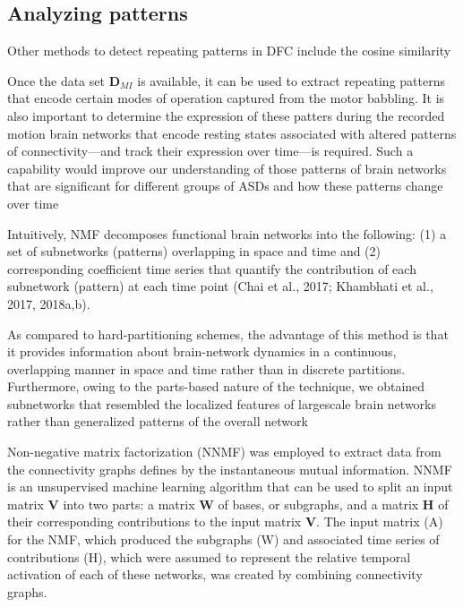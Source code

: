 \subsection{Analyzing patterns}


Other methods to detect repeating patterns in DFC include the cosine similarity \cite{Menon2019comparisonstaticdynamic}


Once the data set $\bm{D}_{MI}$ is available, it can be used to extract repeating patterns that encode certain modes of operation captured from the motor babbling. It is also important to determine the expression of these patters during the recorded motion
brain networks that encode resting states associated with altered patterns of connectivity—and track their expression over time—is required. Such a capability would improve our understanding of those
patterns of brain networks that are significant for different groups of
ASDs and how these patterns change over time

Intuitively, NMF decomposes functional brain networks into the following: (1) a set of subnetworks (patterns) overlapping in space and
time and (2) corresponding coefficient time series that quantify the
contribution of each subnetwork (pattern) at each time point
(Chai et al., 2017; Khambhati et al., 2017, 2018a,b). 

As compared to
hard-partitioning schemes, the advantage of this method is that it
provides information about brain-network dynamics in a continuous,
overlapping manner in space and time rather than in discrete partitions.
Furthermore, owing to the parts-based nature of the technique, we
obtained subnetworks that resembled the localized features of largescale brain networks rather than generalized patterns of the overall
network

Non-negative matrix factorization (NNMF) \cite{Fu2019Nonnegativematrixfactorization} was employed to extract data from the connectivity graphs defines by the instantaneous mutual information. NNMF is an unsupervised machine learning algorithm that can be used to split an input matrix $\bm{V}$ into two parts: a matrix $\bm{W}$ of bases, or subgraphs, and a matrix $\bm{H}$ of their corresponding contributions to the input matrix $\bm{V}$. The input matrix (A) for the NMF, which produced the subgraphs (W) and associated time series of contributions (H), which were assumed to represent the relative temporal activation of each of these networks, was created by combining connectivity graphs.

